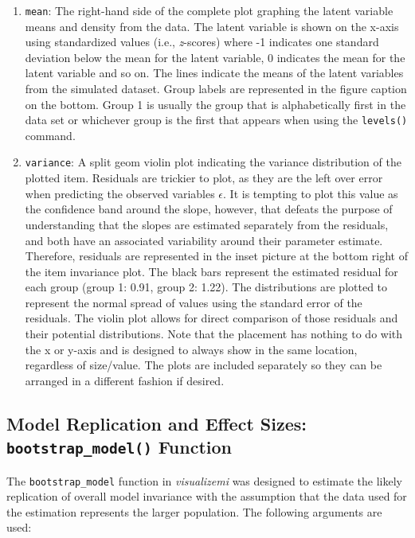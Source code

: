 \documentclass[
  man]{apa7}
\begin{document}
\begin{enumerate}
\def\labelenumi{\arabic{enumi})}
\setcounter{enumi}{2}
\item
  \texttt{mean}: The right-hand side of the complete plot graphing the latent variable means and density from the data. The latent variable is shown on the x-axis using standardized values (i.e., \emph{z}-scores) where -1 indicates one standard deviation below the mean for the latent variable, 0 indicates the mean for the latent variable and so on. The lines indicate the means of the latent variables from the simulated dataset. Group labels are represented in the figure caption on the bottom. Group 1 is usually the group that is alphabetically first in the data set or whichever group is the first that appears when using the \texttt{levels()} command.
\item
  \texttt{variance}: A split geom violin plot indicating the variance distribution of the plotted item. Residuals are trickier to plot, as they are the left over error when predicting the observed variables \(\epsilon\). It is tempting to plot this value as the confidence band around the slope, however, that defeats the purpose of understanding that the slopes are estimated separately from the residuals, and both have an associated variability around their parameter estimate. Therefore, residuals are represented in the inset picture at the bottom right of the item invariance plot. The black bars represent the estimated residual for each group (group 1: 0.91, group 2: 1.22). The distributions are plotted to represent the normal spread of values using the standard error of the residuals. The violin plot allows for direct comparison of those residuals and their potential distributions. Note that the placement has nothing to do with the x or y-axis and is designed to always show in the same location, regardless of size/value. The plots are included separately so they can be arranged in a different fashion if desired.
\end{enumerate}

\newpage

\subsection{\texorpdfstring{Model Replication and Effect Sizes: \texttt{bootstrap\_model()} Function}{Model Replication and Effect Sizes: bootstrap\_model() Function}}\label{model-replication-and-effect-sizes-bootstrap_model-function-1}

The \texttt{bootstrap\_model} function in \emph{visualizemi} was designed to estimate the likely replication of overall model invariance with the assumption that the data used for the estimation represents the larger population. The following arguments are used:
\end{document}
